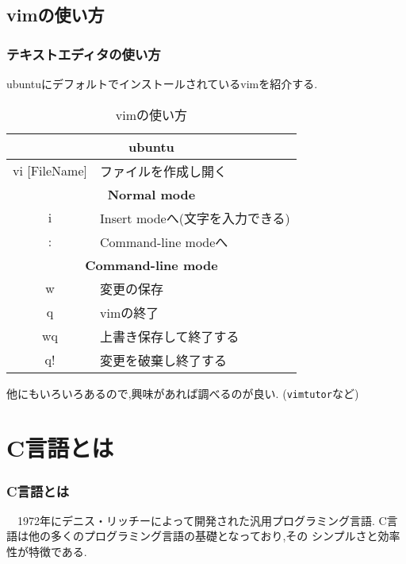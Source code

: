 \documentclass[dvipdfmx]{beamer}
\begin{document}
\subsection{vimの使い方}
\begin{frame}[t, fragile, label=8]
    \frametitle{テキストエディタの使い方}
    ubuntuにデフォルトでインストールされているvimを紹介する.
    \begin{table}[h]
        \caption{vimの使い方}
        \label{vim_howto}
        \centering
        \begin{tabular}{cl}
            \hline  
            \multicolumn{2}{c}{\textbf{ubuntu}}\\
            \hline \hline
            vi [FileName] & ファイルを作成し開く\\
            \hline
            \multicolumn{2}{c}{\textbf{Normal mode}}\\
            \hline \hline
            i & Insert modeへ(文字を入力できる)\\
            : & Command-line modeへ\\
            \hline
            \multicolumn{2}{c}{\textbf{Command-line mode}}\\
            \hline \hline
            w & 変更の保存\\
            q & vimの終了\\
            wq & 上書き保存して終了する\\
            q! & 変更を破棄し終了する\\
            \hline
        \end{tabular}
    \end{table}
    他にもいろいろあるので,興味があれば調べるのが良い.
        (\texttt{vimtutor}など)
    \vfill \hfill 
    \hyperlink{7}{}
    \space
    \hyperlink{9}{}
\end{frame}

\section{C言語とは}
\begin{frame}[c, fragile, label=9]
    \frametitle{C言語とは}
    　1972年にデニス・リッチーによって開発された汎用プログラミング言語.
    C言語は他の多くのプログラミング言語の基礎となっており,その
    シンプルさと効率性が特徴である.
    \vfill \hfill 
    \hyperlink{8}{}
    \space
    \hyperlink{10}{}
\end{frame}
\end{document}
